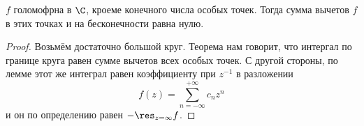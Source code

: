 \begin{conseq}
	$f$ голомофрна в $\C$, кроеме конечного числа особых точек.
	Тогда сумма вычетов $f$ в этих точках и на бесконечности равна нулю.
\end{conseq}
\begin{proof}
	Возьмём достаточно большой круг.
	Теорема нам говорит, что интергал по границе круга равен сумме вычетов всех особых точек.
	С другой стороны, по лемме этот же интеграл равен коэффициенту при $z^{-1}$ в разложении
	\[ f(z) = \sum_{n=-\infty}^{+\infty} c_n z^n \]
	и он по определению равен $-\res_{z=\infty} f$.
\end{proof}
